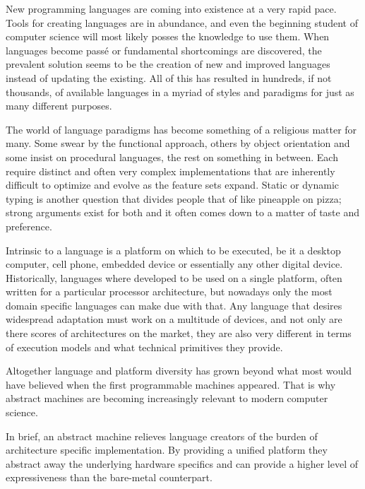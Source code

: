 

New programming languages are coming into existence at a very rapid pace. Tools
for creating languages are in abundance, and even the beginning student of
computer science will most likely posses the knowledge to use them. When
languages become pass\'e or fundamental shortcomings are discovered, the
prevalent solution seems to be the creation of new and improved languages
instead of updating the existing. All of this has resulted in hundreds, if not
thousands, of available languages in a myriad of styles and paradigms for just
as many different purposes.

The world of language paradigms has become something of a religious matter for
many. Some swear by the functional approach, others by object orientation and
some insist on procedural languages, the rest on something in between. Each
require distinct and often very complex implementations that are inherently
difficult to optimize and evolve as the feature sets expand. Static or dynamic
typing is another question that divides people that of like pineapple on
pizza; strong arguments exist for both and it often comes down to a matter of
taste and preference.

Intrinsic to a language is a platform on which to be executed, be it a desktop
computer, cell phone, embedded device or essentially any other digital
device. Historically, languages where developed to be used on a single platform,
often written for a particular processor architecture, but nowadays only the
most domain specific languages can make due with that. Any language that desires
widespread adaptation must work on a multitude of devices, and not only are
there scores of architectures on the market, they are also very different in
terms of execution models and what technical primitives they provide.

Altogether language and platform diversity has grown beyond what most would have
believed when the first programmable machines appeared. That is why abstract
machines are becoming increasingly relevant to modern computer science.

In brief, an abstract machine relieves language creators of the burden of
architecture specific implementation. By providing a unified platform they
abstract away the underlying hardware specifics and can provide a higher level
of expressiveness than the bare-metal counterpart.

